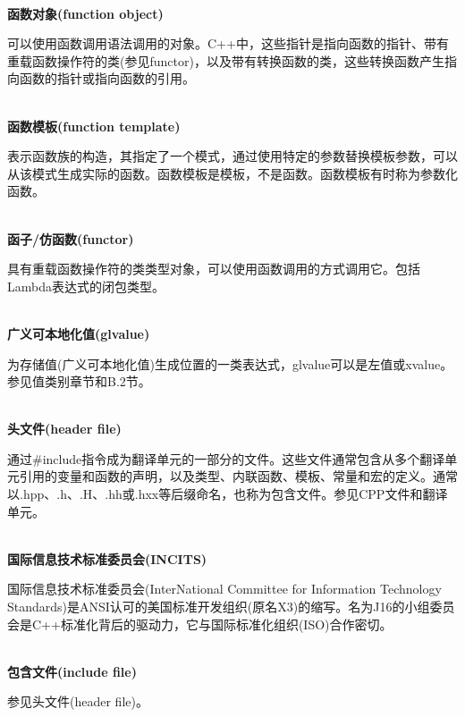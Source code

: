 \hspace*{\fill} \\ %
\noindent
\textbf{函数对象(function object)}

可以使用函数调用语法调用的对象。C++中，这些指针是指向函数的指针、带有重载函数操作符的类(参见functor)，以及带有转换函数的类，这些转换函数产生指向函数的指针或指向函数的引用。

\hspace*{\fill} \\ %
\noindent
\textbf{函数模板(function template)}

表示函数族的构造，其指定了一个模式，通过使用特定的参数替换模板参数，可以从该模式生成实际的函数。函数模板是模板，不是函数。函数模板有时称为参数化函数。

\hspace*{\fill} \\ %
\noindent
\textbf{函子/仿函数(functor)}

具有重载函数操作符的类类型对象，可以使用函数调用的方式调用它。包括Lambda表达式的闭包类型。

\hspace*{\fill} \\ %
\noindent
\textbf{广义可本地化值(glvalue)}

为存储值(广义可本地化值)生成位置的一类表达式，glvalue可以是左值或xvalue。参见值类别章节和B.2节。

\hspace*{\fill} \\ %
\noindent
\textbf{头文件(header file)}

通过\#include指令成为翻译单元的一部分的文件。这些文件通常包含从多个翻译单元引用的变量和函数的声明，以及类型、内联函数、模板、常量和宏的定义。通常以.hpp、.h、.H、.hh或.hxx等后缀命名，也称为包含文件。参见CPP文件和翻译单元。

\hspace*{\fill} \\ %
\noindent
\textbf{国际信息技术标准委员会(INCITS)}

国际信息技术标准委员会(InterNational Committee for Information Technology Standards)是ANSI认可的美国标准开发组织(原名X3)的缩写。名为J16的小组委员会是C++标准化背后的驱动力，它与国际标准化组织(ISO)合作密切。

\hspace*{\fill} \\ %
\noindent
\textbf{包含文件(include file)}

参见头文件(header file)。

